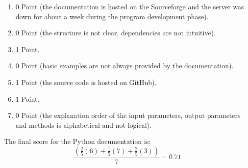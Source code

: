 \documentclass[
  twoside,
  12pt, a4paper,
  footinclude=true,
  headinclude=true,
  cleardoublepage=empty
]{article}
\begin{document}
\begin{enumerate}
    \item 0 Point (the documentation is hosted on the Sourceforge and the server was down for about a week during the program development phase).
    \item 0 Point (the structure is not clear, dependencies are not intuitive).
    \item 1 Point.
    \item 0 Point (basic examples are not always provided by the documentation).
    \item 1 Point (the source code is hosted on GitHub).
    \item 1 Point.
    \item 0 Point (the explanation order of the input parameters, output parameters and methods is alphabetical and not logical).
\end{enumerate}
The final score for the Python documentation is:
\[ \frac{(\frac{2}{5}(6) + \frac{1}{5}(7) + \frac{2}{5}(3) )}{7}= 0.71\]
\end{document}
